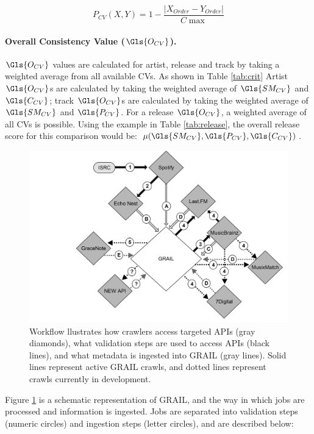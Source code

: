 \documentclass[a4paper]{article}
\begin{document}
\begin{equation}
P_{CV} (X,Y) =  1 - \frac{ |X_{Order} - Y_{Order}|}{C \max}
\label{eq:position}
\end{equation}

\paragraph{Overall Consistency Value ($\Gls{O_{CV}}$).}
$\Gls{O_{CV}}$ values are calculated for artist, release and track by taking a weighted average from all available \Gls{CV}s. As shown in Table \ref{tab:crit} Artist $\Gls{O_{CV}}$s are calculated by taking the weighted average of $\Gls{SM_{CV}}$ and $\Gls{C_{CV}}$; track $\Gls{O_{CV}}$s are calculated by taking the weighted average of $\Gls{SM_{CV}}$ and $\Gls{P_{CV}}$. For a release $\Gls{O_{CV}}$, a weighted average of all \Gls{CV}s is possible. Using the example in Table \ref{tab:release}, the overall release score for this comparison would be: $\mu (\Gls{SM_{CV}},\Gls{P_{CV}},\Gls{C_{CV}})$.

\begin{figure}[h!]
\centering
\includegraphics[width=\linewidth]{grail_workflow.png}
\caption[\Gls{GRAIL} Crawler Workflow]{Workflow llustrates how crawlers access targeted \Gls{API}s (gray diamonds), what validation steps are used to access \Gls{API}s (black lines), and what metadata is ingested into \Gls{GRAIL} (gray lines). Solid lines represent active \Gls{GRAIL} crawls, and dotted lines represent crawls currently in development.}
\label{fig:crawl_workflow}
\end{figure}

\bigskip

Figure \ref{fig:crawl_workflow} is a schematic representation of \Gls{GRAIL}, and the way in which jobs are processed and information is ingested. Jobs are separated into validation steps (numeric circles) and ingestion steps (letter circles), and are described below:\\
\end{document}
